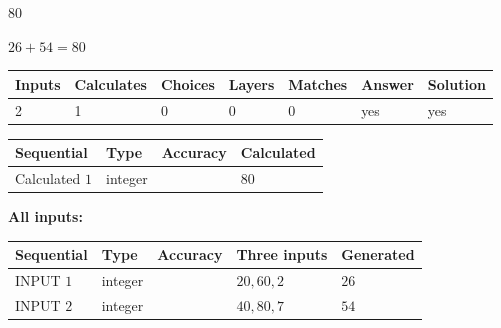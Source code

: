 \documentclass[12pt]{article}
\begin{document}
 

80
 
 
\noindent{}
 
 

 
 
 
\noindent{}
 
 

$ %
26 +  %
54=   %
80$
 
 
\noindent{}
 
 

 
   
   
   
   
\noindent\begin{tabular}{|l|l|l|l|l|l|l|}
 \hline
Inputs & Calculates & Choices & Layers & Matches & Answer & Solution \\ \hline
 2  & 
 1  & 
 0
  & 
 0  & 
 0  & 
  yes & 
  yes 
  \\ \hline
 \end{tabular}
   
   
   
   
\noindent{}
   
   
  
  
\noindent\begin{tabular}{|l|l|l|l|}
\hline
 Sequential & Type & Accuracy & Calculated \\ 
\hline
 
 
  Calculated $  1 $ & integer &  & 
  $ 80 $ 
 \\  \hline  
 \end{tabular}
   
   
   
   
\noindent\vspace{0.1in}\hspace{-0.08in} {\textbf{\Large{All inputs: }}}
   
   
  
  
\noindent\begin{tabular}{|l|l|l|l|l|}
\hline
 Sequential & Type & Accuracy & Three inputs & Generated \\ 
\hline
 
 
  INPUT $  1 $ & integer &  & $
 20
 , 
 60
 , 
 2
 $ & $ 26 $ 
 \\  \hline  
 
 
  INPUT $  2 $ & integer &  & $
 40
 , 
 80
 , 
 7
 $ & $ 54 $ 
 \\  \hline  
 \end{tabular}
   
\end{document}
